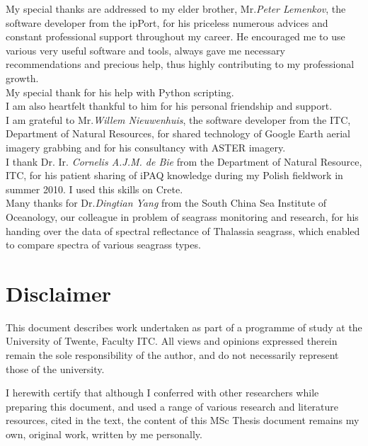 \documentclass[10pt, a4paper]{article}
\begin{document}
My special thanks are addressed to my elder brother, Mr.\textit{Peter Lemenkov}, the software developer from the ipPort, for his priceless numerous advices and constant professional support throughout my career. He encouraged me to use various very useful software and tools, always gave me necessary recommendations and precious help, thus highly contributing to my professional growth. \\ My special thank for his help with Python scripting. \\
I am also heartfelt thankful to him for his personal friendship and support. 
\vspace{1mm}\\
I am grateful to Mr.\textit{Willem Nieuwenhuis}, the software developer from the ITC, Department of Natural Resources, for shared technology of Google Earth aerial imagery grabbing and for his consultancy with ASTER imagery. 
\vspace{1mm}\\
I thank Dr. Ir. \textit{Cornelis A.J.M. de Bie} from the Department of Natural Resource, ITC, for his patient sharing of iPAQ knowledge during my Polish fieldwork in summer 2010. I used this skills on Crete. 
\vspace{1mm}\\
Many thanks for Dr.\textit{Dingtian Yang} from the South China Sea Institute of Oceanology, our colleague in problem of seagrass monitoring and research, for his handing over the data of spectral reflectance of Thalassia seagrass, which enabled to compare spectra of various seagrass types. 

\pagebreak

\section*{Disclaimer}
		This document describes work undertaken as part of a programme of study at the University of
		Twente, Faculty ITC. All views and opinions expressed therein remain the sole responsibility of
		the author, and do not necessarily represent those of the university.\\

\vspace{3em}

		I herewith certify that although I conferred with other researchers while preparing this document, and used a range of various research and literature 			resources, cited in the text, the content of this MSc Thesis document remains my own, original work, written by me personally. \\
\end{document}
